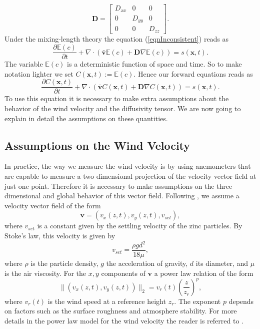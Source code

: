 \documentclass[12pt]{book}
\newcommand{\E}{\mathbb{E}} %
\newcommand{\x}{\textbf{x}}
\newcommand{\vv}{\textbf{v}}
\newcommand{\dv}{\nabla\cdot}
\begin{document}
\begin{equation*}
\textbf{D}=\begin{bmatrix}
D_{xx}& 0 & 0\\
0 & D_{yy} & 0\\
0 & 0 & D_{zz}
\end{bmatrix}.
\end{equation*}
Under the mixing-length theory the equation (\ref{eqnInconsistent}) reads as
\begin{equation*}
\frac{\partial\E(c)}{\partial t}+\dv(\bar{\vv}\E(c)+\textbf{D}\nabla\E(c))=s(\x,t).
\end{equation*}
The variable $\E(c)$ is a deterministic function of space and time. So to make
notation lighter we set $C(\x,t):=\E(c)$. Hence our forward equations
reads as
\begin{equation}\label{eqnDifussivityFinalForm}
\frac{\partial C(\x,t)}{\partial t}+\dv(\bar{\vv}C(\x,t)+\textbf{D}\nabla C(\x,t))=s(\x,t).
\end{equation}
To use this equation it is necessary to make extra assumptions about the behavior of
the wind velocity and the diffusivity tensor. We are now going to explain in detail
the assumptions on these quantities.


\subsection{Assumptions on the Wind Velocity}
In practice, the way we measure the wind velocity is by using anemometers that are capable to 
measure a two dimensional projection of the   velocity vector field at just one point. Therefore
it is necessary to make assumptions on the three dimensional and global behavior of this vector field.
Following \cite{hosseini2016airborne}, we assume a velocity vector field of the form 
\begin{equation*}
\vv=(v_{x}(z,t),v_{y}(z,t),v_{set}),
\end{equation*}
where $v_{set}$ is a constant given by  the settling velocity of the zinc particles. By Stoke's law,
this velocity is given by
\begin{equation*}
v_{set}=\frac{\rho g d^{2}}{18\mu},
\end{equation*}
where $\rho$ is the particle density, $g$ the acceleration of gravity,  $d$ its diameter, and
$\mu$ is the air viscosity. For the $x,y$ components of $\vv$ a power law relation of the form
\begin{equation*}
\|(v_{x}(z,t),v_{y}(z,t))\|_{2}=v_{r}(t)\left(\frac{z}{z_{r}}\right)^{p},
\end{equation*}
where $v_{r}(t)$  is the wind speed at a reference height $z_{r}$. The exponent $p$ depends on 
factors such as the surface roughness and atmosphere stability. For more details in the power
law model for the wind velocity the reader is referred to \cite{seinfeld1998atmospheric}.
\end{document}
